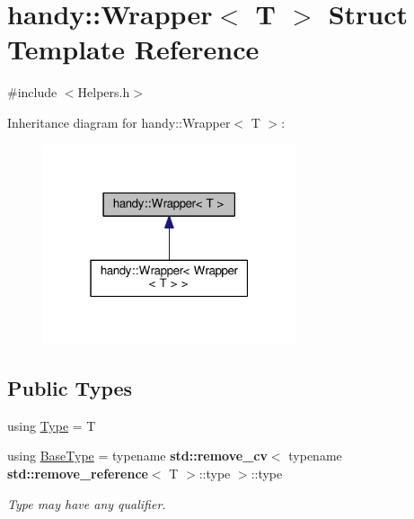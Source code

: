 \hypertarget{structhandy_1_1Wrapper}{}\section{handy\+:\+:Wrapper$<$ T $>$ Struct Template Reference}
\label{structhandy_1_1Wrapper}


{\ttfamily \#include $<$Helpers.\+h$>$}



Inheritance diagram for handy\+:\+:Wrapper$<$ T $>$\+:\nopagebreak
\begin{figure}[H]
\begin{center}
\leavevmode
\includegraphics[width=211pt]{structhandy_1_1Wrapper__inherit__graph}
\end{center}
\end{figure}
\subsection*{Public Types}
\begin{DoxyCompactItemize}
\item 
using \hyperlink{structhandy_1_1Wrapper_a877565c213a6ed7c404dee887a5783e4}{Type} = T
\item 
using \hyperlink{structhandy_1_1Wrapper_ae1b1bf1b6e0b270b98fa2028638117b4}{Base\+Type} = typename {\bf std\+::remove\+\_\+cv}$<$ typename {\bf std\+::remove\+\_\+reference}$<$ T $>$\+::type $>$\+::type
\begin{DoxyCompactList}\small\item\em Type may have any qualifier. \end{DoxyCompactList}\end{DoxyCompactItemize}
